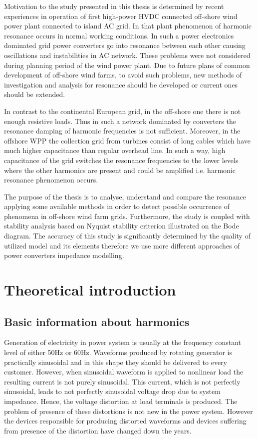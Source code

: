 \documentclass[12pt]{report} %
\begin{document}
Motivation to the study presented in this thesis is determined by recent experiences in operation of first high-power HVDC connected off-shore wind power plant connected to island AC grid. In that plant phenomenon of harmonic resonance occurs in normal working conditions. In such a power electronics dominated grid power converters go into resonance between each other causing oscillations and instabilities in AC network. These problems were not considered during planning period of the wind power plant. Due to future plans of common development of off-shore wind farms, to avoid such problems, new methods of investigation and analysis for resonance should be developed or current ones should be extended.

In contrast to the continental European grid, in the off-shore one there is not enough resistive loads. Thus in such a network dominated by converters the resonance damping of harmonic frequencies is not sufficient. Moreover, in the offshore WPP the collection grid from turbines consist of long cables which have much higher capacitance than regular overhead line. In such a way, high capacitance of the grid switches the resonance frequencies to the lower levels where the other harmonics are present and could be amplified i.e. harmonic resonance phenomenon occurs.

The purpose of the thesis is to analyse, understand and compare the resonance applying some available methods in order to detect possible occurrence of phenomena in off-shore wind farm grids. Furthermore, the study is coupled with stability analysis based on Nyquist stability criterion illustrated on the Bode diagram. The accuracy of this study is significantly determined by the quality of utilized model and its elements therefore we use more different approaches of power converters impedance modelling.

\section{Theoretical introduction}
\subsection{Basic information about harmonics}
Generation of electricity in power system is usually at the frequency constant level of either 50Hz or 60Hz. Waveforms produced by rotating generator is practically sinusoidal and in this shape they should be delivered to every customer. However, when sinusoidal waveform is applied to nonlinear load the resulting current is not purely sinusoidal. This current, which is not perfectly sinusoidal, leads to not perfectly sinusoidal voltage drop due to system impedance. Hence, the voltage distortion at load terminals is produced. The problem of presence of these distortions is not new in the power system. However the devices responsible for producing distorted waveforms and devices suffering from presence of the distortion have changed down the years.
\end{document}
